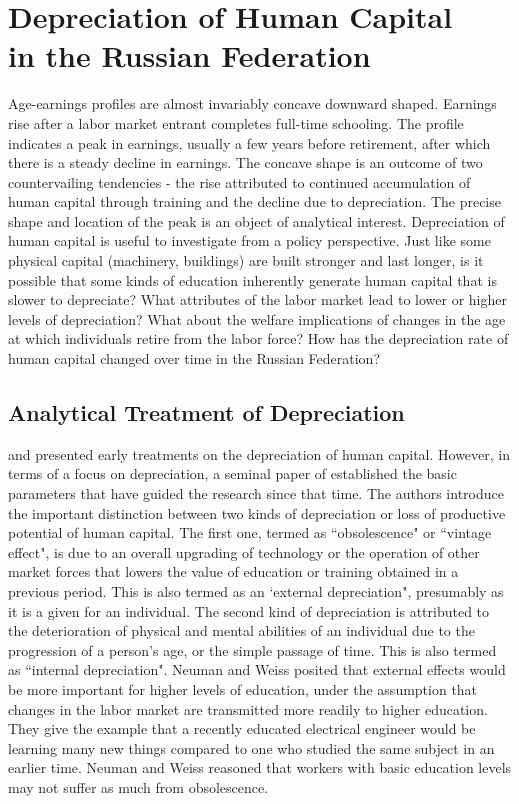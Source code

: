 \documentclass[12pt,a4paper]{article}
\numberwithin{equation}{section}
\begin{document}

\section{Depreciation of Human Capital \\ in the Russian Federation}

Age-earnings profiles are almost invariably concave downward shaped. Earnings rise after a labor market entrant completes full-time schooling. The profile indicates a peak in earnings, usually a few years before retirement, after which there is a steady decline in earnings. The concave shape is an outcome of two countervailing tendencies - the rise attributed to continued accumulation of human capital through training and the decline due to depreciation. The precise shape and location of the peak is an object of analytical interest. Depreciation of human capital is useful to investigate from a policy perspective. Just like some physical capital (machinery, buildings) are built stronger and last longer, is it possible that some kinds of education inherently generate human capital that is slower to depreciate? What attributes of the labor market lead to lower or higher levels of depreciation? What about the welfare implications of changes in the age at which individuals retire from the labor force? How has the depreciation rate of human capital changed over time in the Russian Federation? 

\subsection{Analytical Treatment of Depreciation} 

\citet{rosen_176._1976}  and \citet{mincer_175._1982} presented early treatments on the depreciation of human capital. However, in terms of a focus on depreciation, a seminal paper of \citet{neuman_091._1995} established the basic parameters that have guided the research since that time. The authors introduce the important distinction between two kinds of depreciation or loss of productive potential of human capital. The first one, termed as ``obsolescence" or ``vintage effect", is due to an overall upgrading of technology or the operation of other market forces that lowers the value of education or training obtained in a previous period. This is also termed as an `external depreciation", presumably as it is a given for an individual. The second kind of depreciation is attributed to the deterioration of physical and mental abilities of an individual due to the progression of a person's age, or the simple passage of time. This is also termed as ``internal depreciation". Neuman and Weiss posited that external effects would be more important for higher levels of education, under the assumption that changes in the labor market are transmitted more readily to higher education. They give the example that a recently educated electrical engineer would be learning many new things compared to one who studied the same subject in an earlier time. Neuman and Weiss reasoned that workers with basic education levels may not suffer as much from obsolescence. 
\end{document}
